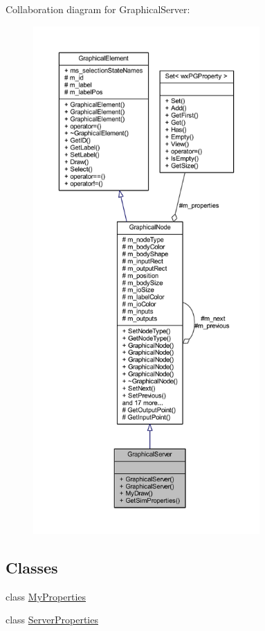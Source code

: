 Collaboration diagram for Graphical\+Server\+:
\nopagebreak
\begin{figure}[H]
\begin{center}
\leavevmode
\includegraphics[height=550pt]{class_graphical_server__coll__graph}
\end{center}
\end{figure}
\subsection*{Classes}
\begin{DoxyCompactItemize}
\item 
class \hyperlink{class_graphical_server_1_1_my_properties}{My\+Properties}
\item 
class \hyperlink{class_graphical_server_1_1_server_properties}{Server\+Properties}
\end{DoxyCompactItemize}
